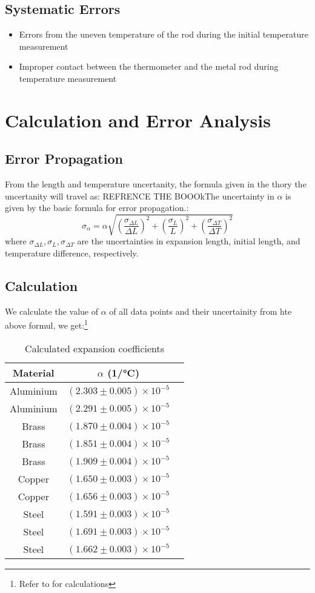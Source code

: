 \documentclass[%
 sor,
 jor,
 amsmath,amssymb,
 reprint,
]{revtex4-2}
\begin{document}
\subsection{Systematic Errors}
\begin{itemize}
	\item Errors from the uneven temperature of the rod during the initial temperature measurement
	\item Improper contact between the thermometer and the metal rod during temperature measurement
\end{itemize}



\section{Calculation and Error Analysis}
\subsection{Error Propagation}
From the length and temperature uncertanity, the formula given in the thory the uncertanity will travel as: REFRENCE THE BOOOkThe uncertainty in $\alpha$ is given by the basic formula for error propagation.:
\[
\sigma_{\alpha} = \alpha \sqrt{\left( \frac{\sigma_{\Delta L}}{\Delta L} \right)^2 + \left( \frac{\sigma_L}{L} \right)^2 + \left( \frac{\sigma_{\Delta T}}{\Delta T} \right)^2}
\]
where $\sigma_{\Delta L}, \sigma_L, \sigma_{\Delta T}$ are the uncertainties in expansion length, initial length, and temperature difference, respectively.

\subsection{Calculation}
We calculate the value of $\alpha$ of all data points and their uncertainity from hte above formul,  we get:\footnote{Refer to \cite{github} for calculations}

\begin{table}[h]
\centering
\begin{tabular}{ccc}
\hline
Material & $\alpha$ (\si{1/\degreeCelsius}) \\
\hline
Aluminium & $(2.303 \pm 0.005) \times 10^{-5}$ \\
Aluminium & $(2.291\pm 0.005) \times 10^{-5}$ \\
Brass & $(1.870\pm 0.004) \times 10^{-5}$ \\
Brass & $(1.851\pm 0.004) \times 10^{-5}$ \\
Brass & $(1.909\pm 0.004) \times 10^{-5}$ \\
Copper & $(1.650\pm 0.003) \times 10^{-5}$ \\
Copper & $(1.656\pm 0.003) \times 10^{-5}$ \\
Steel & $(1.591\pm 0.003) \times 10^{-5}$ \\
Steel & $(1.691\pm 0.003) \times 10^{-5}$ \\
Steel & $(1.662\pm 0.003) \times 10^{-5}$ \\
\hline


\end{tabular}
\caption{Calculated expansion coefficients}
\end{table}
\end{document}
